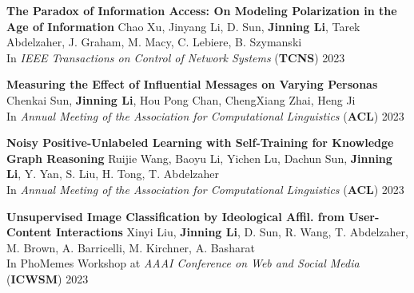\documentclass[12pt, letterpaper]{article}
\begin{document}
\textbf{The Paradox of Information Access: On Modeling Polarization in the Age of Information}
\href{http://jinningli.cn/files/papers/tcns.pdf}{}
\newline
\footnotesize
Chao Xu, Jinyang Li, D. Sun, \textbf{Jinning Li}, Tarek Abdelzaher, J. Graham, M. Macy, C. Lebiere, B. Szymanski\\
In \emph{IEEE Transactions on Control of Network Systems} (\textbf{TCNS}) 2023
\small
\vspace{2pt}

\textbf{Measuring the Effect of Influential Messages on Varying Personas}
\href{http://jinningli.cn/files/papers/acl_measuring.pdf}{}\href{https://github.com/chenkaisun/response_forecasting}{}
\newline
\footnotesize
Chenkai Sun, \textbf{Jinning Li}, Hou Pong Chan, ChengXiang Zhai, Heng Ji\\
In \emph{Annual Meeting of the Association for Computational Linguistics} (\textbf{ACL}) 2023
\small
\vspace{2pt}

\textbf{Noisy Positive-Unlabeled Learning with Self-Training for Knowledge Graph Reasoning}
\href{http://jinningli.cn/files/papers/acl_npugraph.pdf}{}
\newline
\footnotesize
Ruijie Wang, Baoyu Li, Yichen Lu, Dachun Sun, \textbf{Jinning Li}, Y. Yan, S. Liu, H. Tong, T. Abdelzaher\\
In \emph{Annual Meeting of the Association for Computational Linguistics} (\textbf{ACL}) 2023
\small
\vspace{2pt}

\textbf{Unsupervised Image Classification by Ideological Affil. from User-Content Interactions}
\href{http://jinningli.cn/files/papers/phomemes.pdf}{}
\newline
\footnotesize
Xinyi Liu, \textbf{Jinning Li}, D. Sun, R. Wang, T. Abdelzaher, M. Brown, A. Barricelli, M. Kirchner, A. Basharat\\
In PhoMemes Workshop at \emph{AAAI Conference on Web and Social Media} (\textbf{ICWSM}) 2023
\small
\vspace{2pt}
\end{document}
